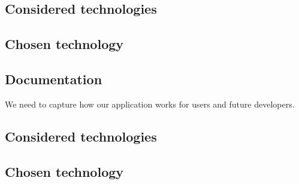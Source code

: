 \subsection*{Considered technologies}

\subsubsection*{}

\subsubsection*{}

\subsection*{Chosen technology}

\subsection{Documentation}
We need to capture how our application works for users and future developers.
\subsection*{Considered technologies}

\subsubsection*{}

\subsubsection*{}

\subsection*{Chosen technology}

